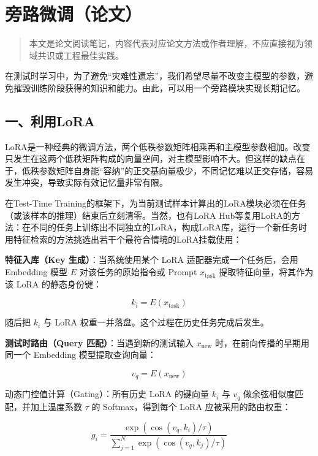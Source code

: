 \clearpage

\hypertarget{ux65c1ux8defux5faeux8c03ux8bbaux6587}{%
\section{旁路微调（论文）}\label{ux65c1ux8defux5faeux8c03ux8bbaux6587}}

\begin{quote}
本文是论文阅读笔记，内容代表对应论文方法或作者理解，不应直接视为领域共识或工程最佳实践。
\end{quote}

在测试时学习中，为了避免``灾难性遗忘''，我们希望尽量不改变主模型的参数，避免摧毁训练阶段获得的知识和能力。由此，可以用一个旁路模块实现长期记忆。

\hypertarget{ux4e00ux5229ux7528lora}{%
\subsection{一、利用LoRA}\label{ux4e00ux5229ux7528lora}}

LoRA是一种经典的微调方法，两个低秩参数矩阵相乘再和主模型参数相加。改变只发生在这两个低秩矩阵构成的向量空间，对主模型影响不大。但这样的缺点在于，低秩参数矩阵自身能``容纳''的正交基向量极少，不同记忆难以正交存储，容易发生冲突，导致实际有效记忆量非常有限。

在Test-Time Training的框架下，为当前测试样本计算出的LoRA模块必须在任务（或该样本的推理）结束后立刻清零。当然，也有LoRA Hub等复用LoRA的方法：在不同的任务上训练出不同独立的LoRA，构成LoRA库，运行一个新任务时用特征检索的方法挑选出若干个最符合情境的LoRA挂载使用：

\textbf{特征入库（Key 生成）}：当系统使用某个 LoRA 适配器完成一个任务后，会用 Embedding 模型 \(E\) 对该任务的原始指令或 Prompt \(x_{\mathrm{task}}\) 提取特征向量，将其作为该 LoRA 的静态身份键：

\[
k_i = E(x_{\mathrm{task}})
\]

随后把 \(k_i\) 与 LoRA 权重一并落盘。这个过程在历史任务完成后发生。

\textbf{测试时路由（Query 匹配）}：当遇到新的测试输入 \(x_{\mathrm{new}}\) 时，在前向传播的早期用同一个 Embedding 模型提取查询向量：

\[
v_q = E(x_{\mathrm{new}})
\]

动态门控值计算（Gating）：所有历史 LoRA 的键向量 \(k_i\) 与 \(v_q\) 做余弦相似度匹配，并加上温度系数 \(\tau\) 的 Softmax，得到每个 LoRA 应被采用的路由权重：

\[
g_i =
\frac{\exp(\cos(v_q,k_i)/\tau)}
{\sum_{j=1}^{N}\exp(\cos(v_q,k_j)/\tau)}
\]

